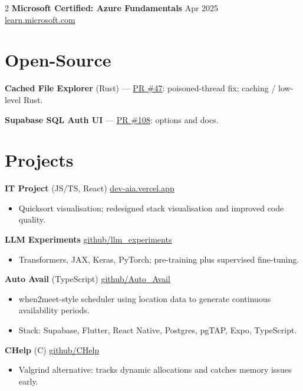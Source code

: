 \documentclass[10pt, a4paper]{article}
\begin{document}
\begin{multicols}{2}
\textbf{Microsoft Certified: Azure Fundamentals} \hfill Apr 2025 \\
\href{https://learn.microsoft.com/en-us/credentials/certifications/azure-fundamentals/}{learn.microsoft.com}

\section{Open-Source}

\textbf{Cached File Explorer} (Rust) --- \href{https://github.com/conaticus/FileExplorer/pull/47}{PR \#47}: poisoned-thread fix; caching / low-level Rust.

\textbf{Supabase SQL Auth UI} --- \href{https://github.com/supabase-community/flutter-auth-ui/pull/108}{PR \#108}: options and docs.

\section{Projects}

\textbf{IT Project} (JS/TS, React) \hfill \href{https://dev-aia.vercel.app/}{dev-aia.vercel.app}
\begin{itemize}
  \item Quicksort visualisation; redesigned stack visualisation and improved code quality.
\end{itemize}

\textbf{LLM Experiments} \hfill \href{https://github.com/HenryRoutson/llm_experiments}{github/llm\_experiments}
\begin{itemize}
  \item Transformers, JAX, Keras, PyTorch; pre-training plus supervised fine-tuning.
\end{itemize}

\textbf{Auto Avail} (TypeScript) \hfill \href{https://github.com/HenryRoutson/Auto_Avail}{github/Auto\_Avail}
\begin{itemize}
  \item when2meet-style scheduler using location data to generate continuous availability periods.
  \item Stack: Supabase, Flutter, React Native, Postgres, pgTAP, Expo, TypeScript.
\end{itemize}

\textbf{CHelp} (C) \hfill \href{https://github.com/HenryRoutson/CHelp}{github/CHelp}
\begin{itemize}
  \item Valgrind alternative: tracks dynamic allocations and catches memory issues early.
\end{itemize}


\end{multicols}
\end{document}
